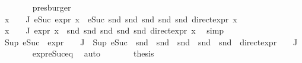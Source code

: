 \begin{isabellebody}
\ \ \ \ \ \ \isamarkupfalse%
\ presburger\ \isanewline
\ \ \ \ \isamarkupfalse%
\ {\isachardoublequoteopen}{\isasymforall}x\ {\isasymin}\ {\isasymPhi}\ {\isacharbackquote}{\kern0pt}\ J{\isachardot}{\kern0pt}\ eSuc\ {\isacharparenleft}{\kern0pt}expr{\isacharunderscore}{\kern0pt}{}\ x{\isacharparenright}{\kern0pt}\ {\isacharequal}{\kern0pt}\ eSuc\ {\isacharparenleft}{\kern0pt}snd\ {\isacharparenleft}{\kern0pt}snd\ {\isacharparenleft}{\kern0pt}snd\ {\isacharparenleft}{\kern0pt}snd\ {\isacharparenleft}{\kern0pt}snd\ {\isacharparenleft}{\kern0pt}direct{\isacharunderscore}{\kern0pt}expr\ x{\isacharparenright}{\kern0pt}{\isacharparenright}{\kern0pt}{\isacharparenright}{\kern0pt}{\isacharparenright}{\kern0pt}{\isacharparenright}{\kern0pt}{\isacharparenright}{\kern0pt}{\isachardoublequoteclose}\isanewline
\ \ \ \ \ \ \isamarkupfalse%
\ {\isacartoucheopen}{\isasymforall}x\ {\isasymin}\ {\isasymPhi}\ {\isacharbackquote}{\kern0pt}\ J{\isachardot}{\kern0pt}\ expr{\isacharunderscore}{\kern0pt}{}\ x\ {\isacharequal}{\kern0pt}\ snd\ {\isacharparenleft}{\kern0pt}snd\ {\isacharparenleft}{\kern0pt}snd\ {\isacharparenleft}{\kern0pt}snd\ {\isacharparenleft}{\kern0pt}snd\ {\isacharparenleft}{\kern0pt}direct{\isacharunderscore}{\kern0pt}expr\ x{\isacharparenright}{\kern0pt}{\isacharparenright}{\kern0pt}{\isacharparenright}{\kern0pt}{\isacharparenright}{\kern0pt}{\isacharparenright}{\kern0pt}{\isacartoucheclose}\ \isamarkupfalse%
\ simp\isanewline
\ \ \ \ \isamarkupfalse%
\ {\isachardoublequoteopen}Sup\ {\isacharparenleft}{\kern0pt}{\isacharparenleft}{\kern0pt}eSuc\ {\isasymcirc}\ expr{\isacharunderscore}{\kern0pt}{}\ {\isasymcirc}\ {\isasymPhi}{\isacharparenright}{\kern0pt}\ {\isacharbackquote}{\kern0pt}\ J{\isacharparenright}{\kern0pt}\ {\isacharequal}{\kern0pt}\ Sup\ {\isacharparenleft}{\kern0pt}{\isacharparenleft}{\kern0pt}eSuc\ {\isasymcirc}\ snd\ {\isasymcirc}\ snd\ {\isasymcirc}\ snd\ {\isasymcirc}\ snd\ {\isasymcirc}\ snd\ {\isasymcirc}\ direct{\isacharunderscore}{\kern0pt}expr\ {\isasymcirc}\ {\isasymPhi}{\isacharparenright}{\kern0pt}\ {\isacharbackquote}{\kern0pt}\ J{\isacharparenright}{\kern0pt}{\isachardoublequoteclose}\isanewline
\ \ \ \ \ \ \isamarkupfalse%
\ expr{\isacharunderscore}{\kern0pt}{}{\isacharunderscore}{\kern0pt}eSuc{\isacharunderscore}{\kern0pt}eq\ \isamarkupfalse%
\ auto\isanewline
\ \ \ \ \isamarkupfalse%
\ \isamarkupfalse%
\ {\isacharquery}{\kern0pt}thesis\ \isamarkupfalse%

\end{isabellebody}
